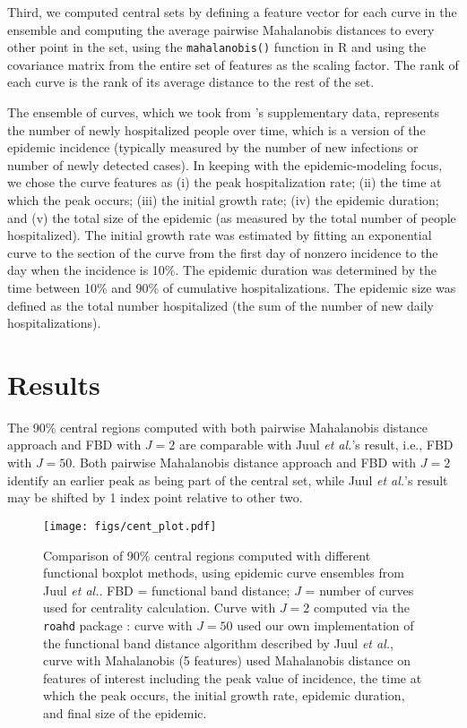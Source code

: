 \documentclass[fleqn,10pt,lineno]{wlpeerj}
\newcommand{\juul}{Juul \emph{et al.}\xspace}  %
\begin{document}
Third, we computed central sets by defining a feature vector for each curve in the ensemble and computing the average pairwise Mahalanobis distances to every other point in the set, using the {\tt mahalanobis()} function in R and using the covariance matrix from the entire  set of features as the scaling factor. The rank of each curve is the rank of its average distance to the rest of the set.

The ensemble of curves, which we took from \cite{juul2021fixed}'s supplementary data, represents the number of newly hospitalized people over time, which is a version of the epidemic incidence (typically measured by the number of new infections or number of newly detected cases).
In keeping with the epidemic-modeling focus, we chose the curve features as (i) the peak
hospitalization rate; (ii) the time at which the peak occurs; (iii) the initial growth rate; (iv) the epidemic duration; and (v) the total size of the epidemic (as measured by the total number of people hospitalized). The initial growth rate was estimated by fitting an exponential curve to the section of the curve from the first day of nonzero incidence to the day when the incidence is 10\%. The epidemic duration was determined by the time between 10\% and 90\% of cumulative hospitalizations. The epidemic size was defined as the total number hospitalized (the sum of the number of new daily hospitalizations).

\section*{Results}

The 90\% central regions computed with both pairwise Mahalanobis distance approach and FBD with $J=2$ are comparable with \juul's result, i.e., FBD with $J=50$. Both pairwise Mahalanobis distance approach and FBD with $J=2$ identify an earlier peak as being part of the central set, while \juul's result may be shifted by 1 index point relative to other two.

\begin{figure}[ht]\centering
  \texttt{[image: figs/cent\_plot.pdf]}
  \caption{Comparison of 90\% central regions computed with
    different functional boxplot methods, using epidemic curve ensembles from \juul. FBD = functional band distance; $J$ = number of curves used for centrality calculation. Curve with $J=2$ computed via the \texttt{roahd} package \citep{roahd}: curve with $J=50$ used our own implementation of the functional band distance algorithm described by \juul, curve with Mahalanobis (5 features) used Mahalanobis distance on features of interest including the peak value of incidence, the time at which the peak occurs, the initial growth rate, epidemic duration, and final size of the epidemic.
  }
  \label{p.a}
\end{figure}
 
\end{document}
